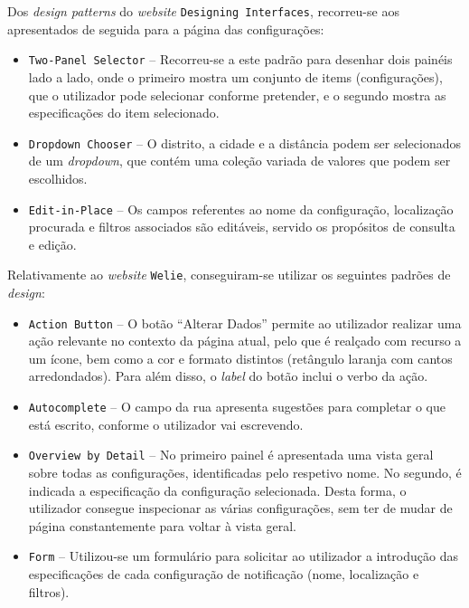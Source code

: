 Dos \textit{design patterns} do \textit{website} \texttt{Designing Interfaces}, recorreu-se aos apresentados de seguida para a página das configurações:

\begin{itemize}
    \item \texttt{Two-Panel Selector} -- Recorreu-se a este padrão para desenhar dois painéis lado a lado, onde o primeiro mostra um conjunto de items (configurações), que o utilizador pode selecionar conforme pretender, e o segundo mostra as especificações do item selecionado.
    
    \item \texttt{Dropdown Chooser} -- O distrito, a cidade e a distância podem ser selecionados de um \textit{dropdown}, que contém uma coleção variada de valores que podem ser escolhidos.
    
    \item \texttt{Edit-in-Place} -- Os campos referentes ao nome da configuração, localização procurada e filtros associados são editáveis, servido os propósitos de consulta e edição.
\end{itemize}

Relativamente ao \textit{website} \texttt{Welie}, conseguiram-se utilizar os seguintes padrões de \textit{design}:

\begin{itemize}
    \item \texttt{Action Button} -- O botão ``Alterar Dados'' permite ao utilizador realizar uma ação relevante no contexto da página atual, pelo que é realçado com recurso a um ícone, bem como a cor e formato distintos (retângulo laranja com cantos arredondados). Para além disso, o \textit{label} do botão inclui o verbo da ação.
    
    \item \texttt{Autocomplete} --  O campo da rua apresenta sugestões para completar o que está escrito, conforme o utilizador vai escrevendo.
    
    \item \texttt{Overview by Detail} -- No primeiro painel é apresentada uma vista geral sobre todas as configurações, identificadas pelo respetivo nome. No segundo, é indicada a especificação da configuração selecionada. Desta forma, o utilizador consegue inspecionar as várias configurações, sem ter de mudar de página constantemente para voltar à vista geral.
    
    \item \texttt{Form} -- Utilizou-se um formulário para solicitar ao utilizador a introdução das especificações de cada configuração de notificação (nome, localização e filtros).
\end{itemize}


